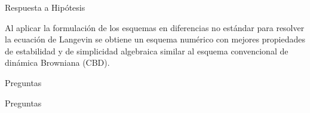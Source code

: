 \begin{frame}{Respuesta a Hip\'otesis}
	\begin{exampleblock}{}
		Al aplicar la formulaci\'on de los esquemas en diferencias no est\'andar para resolver la ecuación de 
		Langevin se obtiene un esquema numérico con mejores propiedades de estabilidad y de
		simplicidad algebraica similar al esquema convencional de dinámica Browniana (CBD).	
	\end{exampleblock}
\end{frame}

\begin{frame}{Preguntas}
	\begin{exampleblock}{}
			Preguntas
	\end{exampleblock}
\end{frame}

